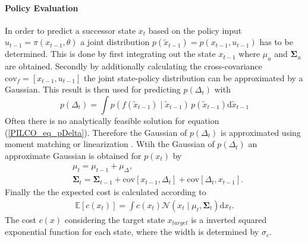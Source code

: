 \documentclass[letterpaper, 10 pt, conference]{ieeeconf}  %
\begin{document}
\paragraph{Policy Evaluation}
In order to predict a successor state $x_t$ based on the policy input $u_{t-1} = \pi\left(x_{t-1},\theta\right)$ a joint distribution $p\left(\tilde{x}_{t-1}\right) = p\left(x_{t-1},u_{t-1}\right)$ has to be determined. This is done by first integrating out the state $x_{t-1}$ where $\mu_u$ and $\mathbf{\Sigma}_u$ are obtained. Secondly by additionally calculating the cross-covariance $\text{cov}_f = \left[{x}_{t-1},u_{t-1}\right]$ the joint state-policy distribution can be approximated by a Gaussian. This result is then used for predicting $p\left(\Delta_t\right)$ with
\begin{equation}\label{PILCO_eq_pDelta}
p\left(\Delta_t\right) = \int p\left(f(\tilde{x}_{t-1})\mid\tilde{x}_{t-1}\right)\, p\left(\tilde{x}_{t-1}\right) \text{d}\tilde{x}_{t-1}
\end{equation}
Often there is no analytically feasible solution for equation (\ref{PILCO_eq_pDelta}). Therefore the Gaussian of $p\left(\Delta_t\right)$ is approximated using moment matching or linearization \cite{GP_deisenroth}. Wtih the Gaussian of $p\left(\Delta_t\right)$ an approximate Gaussian is obtained for $p\left(x_t\right)$ by
\begin{align}
&\mu_t = \mu_{t-1}+\mu_\Delta, \\
&\mathbf{\Sigma}_t = \mathbf{\Sigma}_{t-1} +\text{cov}\left[x_{t-1},\Delta_{t}\right]+\text{cov}\left[\Delta_t,x_{t-1}\right].
\end{align}
Finally the the expected cost is calculated according to 
\begin{align}
\mathbb{E}\left[c\left(x_t\right)\right] = \int c\left(x_t\right) \mathcal{N}\left(x_t\mid\mu_t,\mathbf{\Sigma}_t\right) \text{d}x_t.
\end{align}
The cost $c(x)$ considering the target state $x_{target}$ is a inverted squared exponential function for each state,
where the width is determined by $\sigma_c$.
\end{document}
